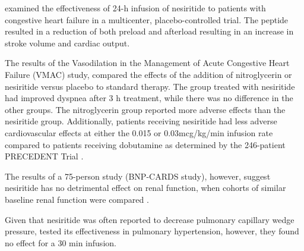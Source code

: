 \documentclass[14pt,a4paper,onecolumn]{extarticle}
\begin{document}

\citep{Mills1999} examined the effectiveness of 24-h infusion of nesiritide to patients with congestive heart failure in a multicenter, placebo-controlled trial. The peptide resulted in a reduction of both preload and afterload resulting in an increase in stroke volume and cardiac output.

The results of the Vasodilation in the Management of Acute Congestive Heart Failure (VMAC) study, compared the effects of the addition of nitroglycerin or nesiritide versus placebo to standard therapy. The group treated with nesiritide had improved dyspnea after 3 h treatment, while there was no difference in the other groups. The nitroglycerin group reported more adverse effects than the nesiritide group. Additionally, patients receiving nesiritide had less adverse cardiovascular effects at either the 0.015 or 0.03mcg/kg/min infusion rate compared to patients receiving dobutamine as determined by the 246-patient PRECEDENT Trial \citep{deLissovoy2003}.


The results of a 75-person study (BNP-CARDS study), however, suggest nesiritide has no detrimental effect on renal function, when cohorts of similar baseline renal function were compared \citep{Witteles2007}.

Given that nesiritide was often reported to decrease pulmonary capillary wedge pressure, \citep{Michaels2005} tested its effectiveness in pulmonary hypertension, however, they found no effect for a 30 min infusion.

\end{document}
